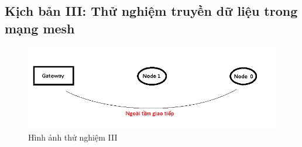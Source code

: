         \subsection{Kịch bản III: Thử nghiệm truyền dữ liệu trong mạng mesh}
        \begin{figure}[h!]
	    	 \begin{center}
	    		\includegraphics[scale=0.8]{images/ex3-1.png}
	    		\caption{Hình ảnh thử nghiệm III}
	    	\end{center}
        \end{figure}
